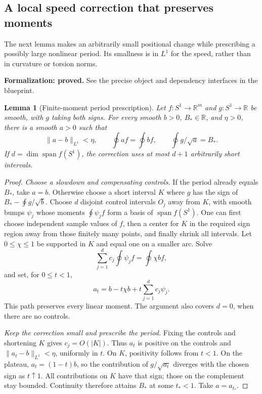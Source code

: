 \documentclass[11pt]{amsart}
\newtheorem{lemma}[theorem]{Lemma}
\theoremstyle{definition}
\theoremstyle{remark}
\newcommand{\R}{\mathbb R}\newcommand{\Sph}{\mathbb S}
\numberwithin{equation}{section}
\begin{document}
\subsection{A local speed correction that preserves moments}
The next lemma makes an arbitrarily small positional change while
prescribing a possibly large nonlinear period. Its smallness is in $L^1$
for the speed, rather than in curvature or torsion norms.
\par\noindent\textbf{Formalization: proved.} See the precise object and dependency interfaces in the blueprint.\par
\begin{lemma}[Finite-moment period prescription]\label{lem:finite-moment-balance}
Let $f:S^1\to\R^m$ and $g:S^1\to\R$ be smooth, with $g$ taking both
signs. For every smooth $b>0$, $B_*\in\R$, and $\eta>0$, there is a
smooth $a>0$ such that
\begin{equation}\label{eq:finite-moment-balance}
 \|a-b\|_{L^1}<\eta,\qquad
 \oint af=\oint bf,\qquad \oint g/\sqrt a=B_*.
\end{equation}
If $d=\dim\operatorname{span}f(S^1)$, the correction uses at most $d+1$
arbitrarily short intervals.
\end{lemma}
\begin{proof}
\emph{Choose a slowdown and compensating controls.}
If the period already equals $B_*$, take $a=b$. Otherwise choose a short
interval $K$ where $g$ has the sign of $B_*-\oint g/\sqrt b$.
Choose $d$ disjoint control intervals $O_j$ away from $K$, with smooth
bumps $\psi_j$ whose moments $\oint\psi_jf$ form a basis of
$\operatorname{span}f(S^1)$. One can first choose independent sample
values of $f$, then a center for $K$ in the required sign region away
from those finitely many points, and finally shrink all intervals.
Let $0\le\chi\le1$ be supported in $K$ and equal one on a smaller arc.
Solve
\[
 \sum_{j=1}^d c_j\oint\psi_jf=\oint\chi bf,
\]
and set, for $0\le t<1$,
\[
 a_t=b-t\chi b+t\sum_{j=1}^d c_j\psi_j.
\]
This path preserves every linear moment. The argument also covers $d=0$,
when there are no controls.

\emph{Keep the correction small and prescribe the period.}
Fixing the controls and shortening $K$ gives $c_j=O(|K|)$. Thus $a_t$
is positive on the controls and $\|a_t-b\|_{L^1}<\eta$, uniformly in
$t$. On $K$, positivity follows from $t<1$. On the plateau,
$a_t=(1-t)b$, so the contribution of $g/\sqrt{a_t}$ diverges with the
chosen sign as $t\uparrow1$. All contributions on $K$ have that sign;
those on the complement stay bounded. Continuity therefore attains $B_*$
at some $t_*<1$. Take $a=a_{t_*}$.
\end{proof}
\end{document}
